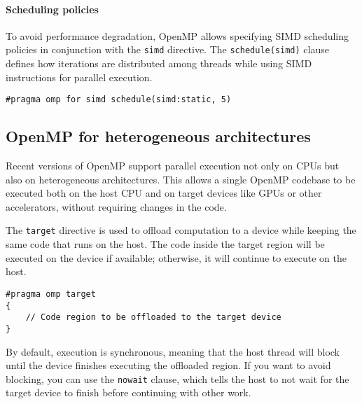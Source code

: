 \paragraph*{Scheduling policies}
To avoid performance degradation, OpenMP allows specifying SIMD scheduling policies in conjunction with the \texttt{simd} directive. 
The \texttt{schedule(simd)} clause defines how iterations are distributed among threads while using SIMD instructions for parallel execution.
\begin{lstlisting}[style=C]
#pragma omp for simd schedule(simd:static, 5) 
\end{lstlisting}

\subsection{OpenMP for heterogeneous architectures}
Recent versions of OpenMP support parallel execution not only on CPUs but also on heterogeneous architectures. 
This allows a single OpenMP codebase to be executed both on the host CPU and on target devices like GPUs or other accelerators, without requiring changes in the code.

The \texttt{target} directive is used to offload computation to a device while keeping the same code that runs on the host. 
The code inside the target region will be executed on the device if available; otherwise, it will continue to execute on the host.
\begin{lstlisting}[style=C]
#pragma omp target
{
    // Code region to be offloaded to the target device
}
\end{lstlisting}
By default, execution is synchronous, meaning that the host thread will block until the device finishes executing the offloaded region.
If you want to avoid blocking, you can use the \texttt{nowait} clause, which tells the host to not wait for the target device to finish before continuing with other work.

